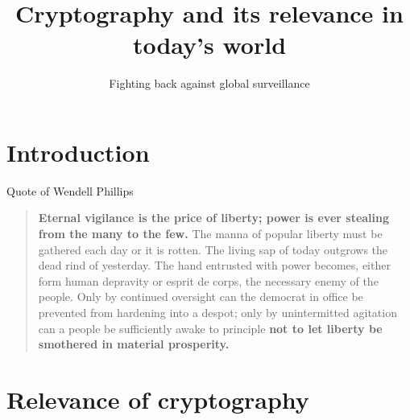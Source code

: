 \documentclass[compress]{beamer}
\title{Cryptography and its relevance in today's world}
\subtitle{Fighting back against global surveillance}
\author{}
\date{}
\theoremstyle{definition}
\theoremstyle{definition}
\theoremstyle{definition}
\theoremstyle{remark}
\theoremstyle{remark}
\theoremstyle{definition}
\theoremstyle{definition}
\theoremstyle{definition}
\theoremstyle{definition}
\theoremstyle{definition}
\theoremstyle{remark}
\theoremstyle{remark}
\theoremstyle{remark}
\theoremstyle{remark}
\begin{document}
		\maketitle
		\begin{frame}
		\tableofcontents
		\end{frame}
	
		\section*{Introduction}
			\begin{frame}
			\begin{block}{Quote of Wendell Phillips}
			\begin{quote}%
			\textbf{Eternal vigilance is the price of liberty; power is ever stealing from the many to the few.} The manna of popular liberty must be gathered each day or it is rotten. The living sap of today outgrows the dead rind of yesterday. The hand entrusted with power becomes, either form human depravity or esprit de corps, the necessary enemy of the people. Only by continued oversight can the democrat in office be prevented from hardening into a despot; only by unintermitted agitation can a people be sufficiently awake to principle \textbf{not to let liberty be smothered in material prosperity.}
			\end{quote}
			\end{block}
			\end{frame}
		
		\section{Relevance of cryptography}
\end{document}
